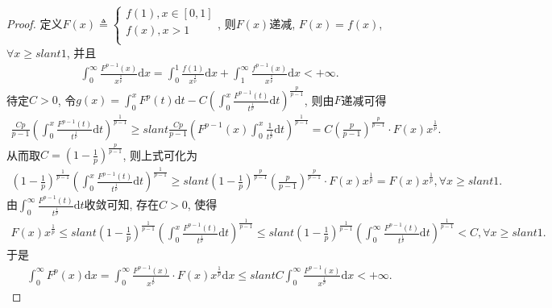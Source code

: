 \documentclass[../../main.tex]{subfiles}
\begin{document}
\begin{proof}
定义$F\left( x \right) \triangleq \begin{cases}
f\left( 1 \right) ,x\in \left[ 0,1 \right]\\
f\left( x \right) ,x>1\\
\end{cases}$, 则$F\left( x \right) $递减, $F\left( x \right) =f\left( x \right) $, $\forall x\geqslant slant 1$, 并且
\begin{align*}
\int_0^{\infty}{\frac{F^{p-1}\left( x \right)}{x^{\frac{1}{p}}}\mathrm{d}x}=\int_0^1{\frac{f\left( 1 \right)}{x^{\frac{1}{p}}}\mathrm{d}x}+\int_1^{\infty}{\frac{f^{p-1}\left( x \right)}{x^{\frac{1}{p}}}\mathrm{d}x}<+\infty .
\end{align*}
待定$C>0$, 令$g\left( x \right) =\int_0^x{F^p\left( t \right)}\mathrm{d}t-C\left( \int_0^x{\frac{F^{p-1}\left( t \right)}{t^{\frac{1}{p}}}\mathrm{d}t} \right) ^{\frac{p}{p-1}}$, 则由$F$递减可得
\begin{align*}
\frac{Cp}{p-1}\left( \int_0^x{\frac{F^{p-1}\left( t \right)}{t^{\frac{1}{p}}}\mathrm{d}t} \right) ^{\frac{1}{p-1}}\geqslant slant \frac{Cp}{p-1}\left( F^{p-1}\left( x \right) \int_0^x{\frac{1}{t^{\frac{1}{p}}}\mathrm{d}t} \right) ^{\frac{1}{p-1}}=C\left( \frac{p}{p-1} \right) ^{\frac{p}{p-1}}\cdot F\left( x \right) x^{\frac{1}{p}}.
\end{align*}
从而取$C=\left( 1-\frac{1}{p} \right) ^{\frac{p}{p-1}}$, 则上式可化为
\begin{align*}
\left( 1-\frac{1}{p} \right) ^{\frac{1}{p-1}}\left( \int_0^x{\frac{F^{p-1}\left( t \right)}{t^{\frac{1}{p}}}\mathrm{d}t} \right) ^{\frac{1}{p-1}}\geqslant slant \left( 1-\frac{1}{p} \right) ^{\frac{p}{p-1}}\left( \frac{p}{p-1} \right) ^{\frac{p}{p-1}}\cdot F\left( x \right) x^{\frac{1}{p}}=F\left( x \right) x^{\frac{1}{p}},\forall x\geqslant slant 1.
\end{align*}
由$\int_0^{\infty}{\frac{F^{p-1}\left( t \right)}{t^{\frac{1}{p}}}\mathrm{d}t}$收敛可知, 存在$C>0$, 使得
\begin{align*}
F\left( x \right) x^{\frac{1}{p}}\leqslant slant \left( 1-\frac{1}{p} \right) ^{\frac{1}{p-1}}\left( \int_0^x{\frac{F^{p-1}\left( t \right)}{t^{\frac{1}{p}}}\mathrm{d}t} \right) ^{\frac{1}{p-1}}\leqslant slant \left( 1-\frac{1}{p} \right) ^{\frac{1}{p-1}}\left( \int_0^{\infty}{\frac{F^{p-1}\left( t \right)}{t^{\frac{1}{p}}}\mathrm{d}t} \right) ^{\frac{1}{p-1}}<C,\forall x\geqslant slant 1.
\end{align*}
于是
\begin{align*}
\int_0^{\infty}{F^p\left( x \right)}\mathrm{d}x=\int_0^{\infty}{\frac{F^{p-1}\left( x \right)}{x^{\frac{1}{p}}}\cdot F\left( x \right) x^{\frac{1}{p}}\mathrm{d}x}\leqslant slant C\int_0^{\infty}{\frac{F^{p-1}\left( x \right)}{x^{\frac{1}{p}}}\mathrm{d}x}<+\infty .
\end{align*}
\end{proof}
\end{document}
